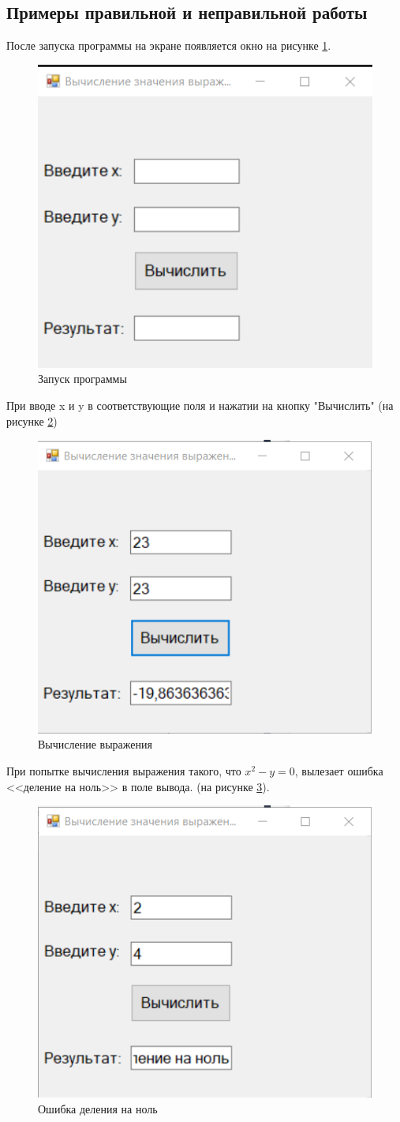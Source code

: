 \subsection{Примеры правильной и неправильной работы}
После запуска программы на экране появляется окно на рисунке \ref{task2_launch1}.
\begin{figure}[H]
    \centering
    \includegraphics[width=0.4\linewidth]{lections/img/task2_launch1.png}
    \caption{Запуск программы}
    \label{task2_launch1}
\end{figure}
При вводе x и y в соответствующие поля и нажатии на кнопку "Вычислить" (на рисунке \ref{task2_launch2})
\begin{figure}[H]
    \centering
    \includegraphics[width=0.4\linewidth]{lections/img/task2_launch2.png}
    \caption{Вычисление выражения}
    \label{task2_launch2}
\end{figure}
При попытке вычисления выражения такого, что $x^2 - y = 0$, вылезает ошибка <<деление на ноль>>  в поле вывода. (на рисунке \ref{task2_launch3}).
\begin{figure}[H]
    \centering
    \includegraphics[width=0.4\linewidth]{lections/img/task2_launch3.png}
    \caption{Ошибка деления на ноль}
    \label{task2_launch3}
\end{figure}

